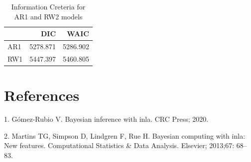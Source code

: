 \documentclass[10pt,letterpaper]{article}
\begin{document}
\begin{table}[!h]

\caption{\label{tab:unnamed-chunk-10}Information Creteria for AR1 and RW2 models}
\centering
\begin{tabular}[t]{l|r|r}
\hline
  & DIC & WAIC\\
\hline
AR1 & 5278.871 & 5286.902\\
\hline
RW1 & 5447.397 & 5460.805\\
\hline
\end{tabular}
\end{table}

\hypertarget{references}{%
\section*{References}\label{references}}

\hypertarget{refs}{}
\leavevmode\hypertarget{ref-gomez2020bayesian}{}%
1. Gómez-Rubio V. Bayesian inference with inla. CRC Press; 2020.

\leavevmode\hypertarget{ref-martins2013bayesian}{}%
2. Martins TG, Simpson D, Lindgren F, Rue H. Bayesian computing with
inla: New features. Computational Statistics \& Data Analysis. Elsevier;
2013;67: 68--83.

\nolinenumbers
\end{document}
